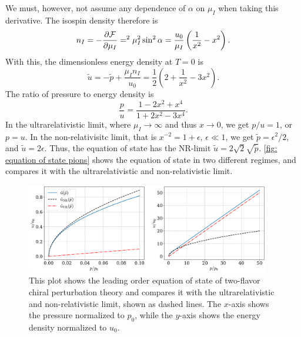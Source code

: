 We must, however, not assume any dependence of $\alpha$ on $\mu_I$ when taking this derivative.
The isospin density therefore is
%
\begin{equation}
    n_I = -\pdv{\mathcal{F}}{\mu_I} = ^2 \mu_I^2 \sin^2 \alpha 
    = 
    \frac{u_0}{\mu_I} \left(\frac{1}{x^2} - x^2\right).
\end{equation}
%
With this, the dimensionless energy density at $T = 0$ is
%
\begin{equation}
    \label{energy density leading order chpt}
    \tilde u = - \tilde p + \frac{\mu_I n_I}{u_0}
    = \frac{1}{2} \left( 2 + \frac{1}{x^2} - 3 x^2\right).
\end{equation}
% 
The ratio of pressure to energy density is
%
\begin{equation} 
    \label{pressure energy ratio leading order chpt}
    \frac{p}{u} = \frac{1- 2x^2 + x^4  }{1 + 2x^2 -3x^4 }.
\end{equation}
%
In the ultrarelativistic limit, where $\mu_I \rightarrow \infty$ and thus $x \rightarrow 0$, we get $p / u = 1$, or $p = u$.
In the non-relativisitc limit, that is $x^{-2} = 1 + \epsilon$, $\epsilon \ll 1$, we get $\tilde p = \epsilon^2 / 2 $, and $\tilde u = 2\epsilon$.
Thus, the equation of state has the NR-limit $\tilde u = 2 \sqrt 2 \sqrt{\tilde p}$.
\autoref{fig: equation of state pions} shows the equation of state in two different regimes, and compares it with the ultrarelativistic and non-relativistic limit.



\begin{figure}[h]
    \centering
    \includegraphics[width=0.95\textwidth]{../scripts/figurer/pion_star/pion_eos.pdf}
    \caption{
        This plot shows the leading order equation of state of two-flavor chiral perturbation theory and compares it with the ultrarelativistic and non-relativistic limit, shown as dashed lines. The $x$-axis shows the pressure normalized to $p_0$, while the $y$-axis shows the energy density normalized to $u_0$.
    }
    \label{fig: equation of state pions}
\end{figure}


